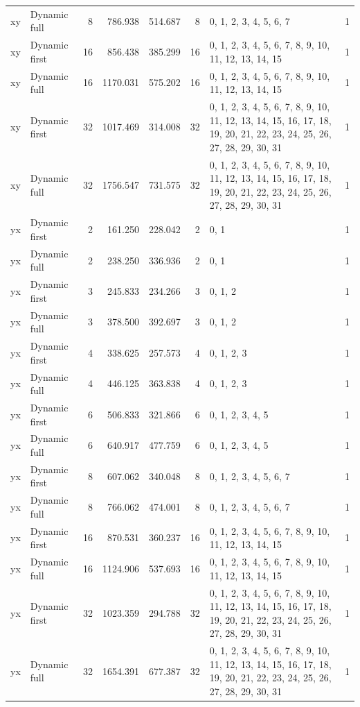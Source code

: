 \documentclass[10pt,a4paper]{article}
\begin{document}
\begin{longtable}{@{}p{23mm}p{29mm}rrrrp{36mm}r@{}}
xy & Dynamic full & 8 & 786.938 & 514.687 & 8 & 0, 1, 2, 3, 4, 5, 6, 7 & 1 \\
xy & Dynamic first & 16 & 856.438 & 385.299 & 16 & 0, 1, 2, 3, 4, 5, 6, 7, 8, 9, 10, 11, 12, 13, 14, 15 & 1 \\
xy & Dynamic full & 16 & 1170.031 & 575.202 & 16 & 0, 1, 2, 3, 4, 5, 6, 7, 8, 9, 10, 11, 12, 13, 14, 15 & 1 \\
xy & Dynamic first & 32 & 1017.469 & 314.008 & 32 & 0, 1, 2, 3, 4, 5, 6, 7, 8, 9, 10, 11, 12, 13, 14, 15, 16, 17, 18, 19, 20, 21, 22, 23, 24, 25, 26, 27, 28, 29, 30, 31 & 1 \\
xy & Dynamic full & 32 & 1756.547 & 731.575 & 32 & 0, 1, 2, 3, 4, 5, 6, 7, 8, 9, 10, 11, 12, 13, 14, 15, 16, 17, 18, 19, 20, 21, 22, 23, 24, 25, 26, 27, 28, 29, 30, 31 & 1 \\
yx & Dynamic first & 2 & 161.250 & 228.042 & 2 & 0, 1 & 1 \\
yx & Dynamic full & 2 & 238.250 & 336.936 & 2 & 0, 1 & 1 \\
yx & Dynamic first & 3 & 245.833 & 234.266 & 3 & 0, 1, 2 & 1 \\
yx & Dynamic full & 3 & 378.500 & 392.697 & 3 & 0, 1, 2 & 1 \\
yx & Dynamic first & 4 & 338.625 & 257.573 & 4 & 0, 1, 2, 3 & 1 \\
yx & Dynamic full & 4 & 446.125 & 363.838 & 4 & 0, 1, 2, 3 & 1 \\
yx & Dynamic first & 6 & 506.833 & 321.866 & 6 & 0, 1, 2, 3, 4, 5 & 1 \\
yx & Dynamic full & 6 & 640.917 & 477.759 & 6 & 0, 1, 2, 3, 4, 5 & 1 \\
yx & Dynamic first & 8 & 607.062 & 340.048 & 8 & 0, 1, 2, 3, 4, 5, 6, 7 & 1 \\
yx & Dynamic full & 8 & 766.062 & 474.001 & 8 & 0, 1, 2, 3, 4, 5, 6, 7 & 1 \\
yx & Dynamic first & 16 & 870.531 & 360.237 & 16 & 0, 1, 2, 3, 4, 5, 6, 7, 8, 9, 10, 11, 12, 13, 14, 15 & 1 \\
yx & Dynamic full & 16 & 1124.906 & 537.693 & 16 & 0, 1, 2, 3, 4, 5, 6, 7, 8, 9, 10, 11, 12, 13, 14, 15 & 1 \\
yx & Dynamic first & 32 & 1023.359 & 294.788 & 32 & 0, 1, 2, 3, 4, 5, 6, 7, 8, 9, 10, 11, 12, 13, 14, 15, 16, 17, 18, 19, 20, 21, 22, 23, 24, 25, 26, 27, 28, 29, 30, 31 & 1 \\
yx & Dynamic full & 32 & 1654.391 & 677.387 & 32 & 0, 1, 2, 3, 4, 5, 6, 7, 8, 9, 10, 11, 12, 13, 14, 15, 16, 17, 18, 19, 20, 21, 22, 23, 24, 25, 26, 27, 28, 29, 30, 31 & 1 \\
\end{longtable}\normalsize\setlength{\tabcolsep}{6pt}
\clearpage
\end{document}
